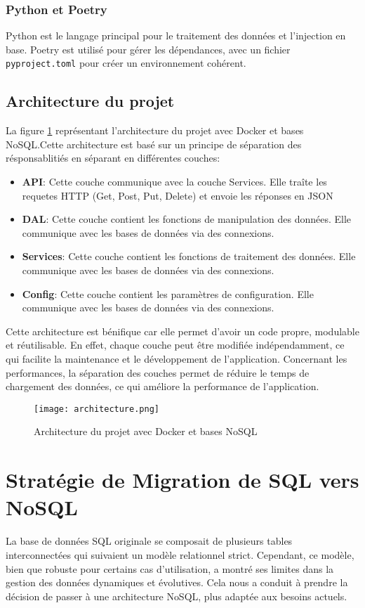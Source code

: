 \subsubsection{Python et Poetry}
Python est le langage principal pour le traitement des données et l’injection en base. Poetry est utilisé pour gérer les dépendances, avec un fichier \texttt{pyproject.toml} pour créer un environnement cohérent.

\subsection{Architecture du projet}

La figure \ref{fig:architecture} représentant l’architecture du projet avec Docker et bases NoSQL.\@ Cette architecture est basé sur un principe de séparation des résponsablitiés en séparant en différentes couches:

\begin{itemize}
  \item \textbf{API}: Cette couche communique avec la couche Services. Elle traîte les requetes HTTP (Get, Post, Put, Delete) et envoie les réponses en JSON
  \item \textbf{DAL}: Cette couche contient les fonctions de manipulation des données. Elle communique avec les bases de données via des connexions.
  \item \textbf{Services}: Cette couche contient les fonctions de traitement des données. Elle communique avec les bases de données via des connexions.
  \item \textbf{Config}: Cette couche contient les paramètres de configuration. Elle communique avec les bases de données via des connexions.
\end{itemize}

Cette architecture est bénifique car elle permet d'avoir un code propre, modulable et réutilisable. En effet, chaque couche peut être modifiée indépendamment, ce qui facilite la maintenance et le développement de l'application. Concernant les performances, la séparation des couches permet de réduire le temps de chargement des données, ce qui améliore la performance de l'application.

\begin{figure}[H]
  \centering
  \texttt{[image: architecture.png]}
  \caption{Architecture du projet avec Docker et bases NoSQL}
  \label{fig:architecture}
\end{figure}


\section{Stratégie de Migration de SQL vers NoSQL}
La base de données SQL originale se composait de plusieurs tables interconnectées qui suivaient un modèle relationnel strict. Cependant, ce modèle, bien que robuste pour certains cas d’utilisation, a montré ses limites dans la gestion des données dynamiques et évolutives. Cela nous a conduit à prendre la décision de passer à une architecture NoSQL, plus adaptée aux besoins actuels.

